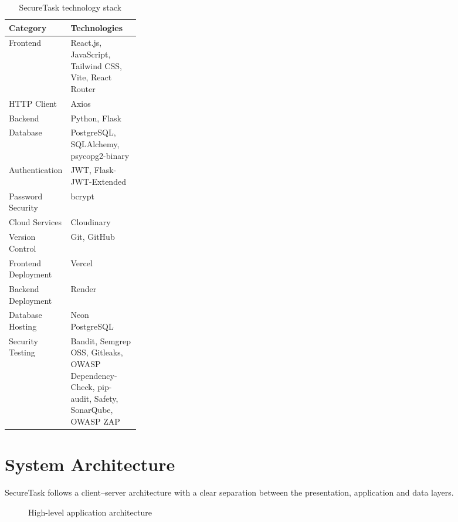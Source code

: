 \documentclass[11pt,a4paper]{article}
\newcommand{\tablehead}{\rowcolor{LightBlue}}
\begin{document}
\begin{table}[htbp]
\centering
\renewcommand{\arraystretch}{1.35}
\begin{tabularx}{\linewidth}{@{}L{0.26\linewidth}X@{}}
\toprule
\tablehead \textbf{Category} & \textbf{Technologies} \\
\midrule
Frontend & React.js, JavaScript, Tailwind CSS, Vite, React Router \\
HTTP Client & Axios \\
Backend & Python, Flask \\
Database & PostgreSQL, SQLAlchemy, psycopg2-binary \\
Authentication & JWT, Flask-JWT-Extended \\
Password Security & bcrypt \\
Cloud Services & Cloudinary \\
Version Control & Git, GitHub \\
Frontend Deployment & Vercel \\
Backend Deployment & Render \\
Database Hosting & Neon PostgreSQL \\
Security Testing & Bandit, Semgrep OSS, Gitleaks, OWASP Dependency-Check, pip-audit, Safety, SonarQube, OWASP ZAP \\
\bottomrule
\end{tabularx}
\caption{SecureTask technology stack}
\end{table}

\section{System Architecture}

SecureTask follows a client--server architecture with a clear separation between the presentation, application and data layers.

\begin{figure}[htbp]
\centering
{}
\caption{High-level application architecture}
\end{figure}
\end{document}
